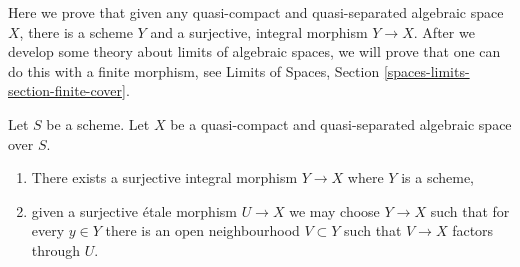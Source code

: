 \noindent
Here we prove that given any quasi-compact and quasi-separated
algebraic space $X$, there is a scheme $Y$ and a surjective, integral
morphism $Y \to X$. After we develop some theory about limits of
algebraic spaces, we will prove that one can do this with a finite
morphism, see
Limits of Spaces, Section \ref{spaces-limits-section-finite-cover}.

\begin{lemma}
\label{lemma-there-is-a-scheme-integral-over}
Let $S$ be a scheme. Let $X$ be a quasi-compact and quasi-separated
algebraic space over $S$.
\begin{enumerate}
\item There exists a surjective integral morphism $Y \to X$ where $Y$
is a scheme,
\item given a surjective \'etale morphism $U \to X$ we may choose
$Y \to X$ such that for every $y \in Y$ there is an open neighbourhood
$V \subset Y$ such that $V \to X$ factors through $U$.
\end{enumerate}
\end{lemma}

